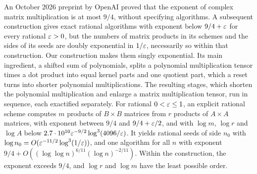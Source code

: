 An October 2026 preprint by OpenAI proved that the exponent of complex
matrix multiplication is at most \(9/4\), without specifying algorithms.
A subsequent construction gives exact rational algorithms with exponent
below \(9/4+\varepsilon\) for every rational \(\varepsilon>0\), but the numbers of
matrix products in its schemes and the sides of its seeds are doubly
exponential in \(1/\varepsilon\), necessarily so within that construction. Our
construction makes them singly exponential. Its main ingredient, a
shifted sum of polynomials, splits a polynomial multiplication tensor
times a dot product into equal kernel parts and one quotient part, which
a reset turns into shorter polynomial multiplications. The resulting
stages, which shorten the polynomial multiplication and enlarge a matrix
multiplication tensor, run in sequence, each exactified separately. For
rational \(0<\varepsilon\le1\), an explicit rational scheme computes \(m\)
products of \(B\times B\) matrices from \(r\) products of \(A\times A\)
matrices, with exponent between \(9/4\) and \(9/4+\varepsilon/2\), and with
\(\log m\), \(\log r\) and \(\log A\) below
\(2.7\cdot10^{10}\varepsilon^{-9/2}\log^3(4096/\varepsilon)\). It yields rational seeds
of side \(n_0\) with \(\log n_0=O(\varepsilon^{-11/2}\log^3(1/\varepsilon))\), and one
algorithm for all \(n\) with exponent
\(9/4+O((\log\log n)^{6/11}(\log n)^{-2/11})\). Within the construction,
the exponent exceeds \(9/4\), and \(\log r\) and \(\log m\) have the
least possible order.
